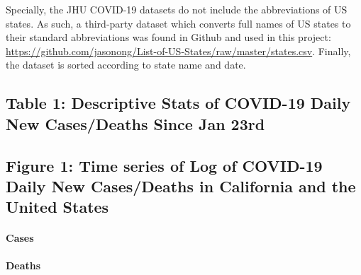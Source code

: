 \documentclass[
]{article}
\begin{document}
Specially, the JHU COVID-19 datasets do not include the abbreviations of
US states. As such, a third-party dataset which converts full names of
US states to their standard abbreviations was found in Github and used
in this project:
\url{https://github.com/jasonong/List-of-US-States/raw/master/states.csv}.
Finally, the dataset is sorted according to state name and date.

\hypertarget{table-1-descriptive-stats-of-covid-19-daily-new-casesdeaths-since-jan-23rd}{%
\subsection{Table 1: Descriptive Stats of COVID-19 Daily New
Cases/Deaths Since Jan
23rd}\label{table-1-descriptive-stats-of-covid-19-daily-new-casesdeaths-since-jan-23rd}}

\hypertarget{htmlwidget-d77711810ca43d831642}{}
\begin{datatables}

\end{datatables}

\hypertarget{figure-1-time-series-of-log-of-covid-19-daily-new-casesdeaths-in-california-and-the-united-states}{%
\subsection{Figure 1: Time series of Log of COVID-19 Daily New
Cases/Deaths in California and the United
States}\label{figure-1-time-series-of-log-of-covid-19-daily-new-casesdeaths-in-california-and-the-united-states}}

\hypertarget{cases}{%
\paragraph{Cases}\label{cases}}

\hypertarget{htmlwidget-e62dd78dc574b438acee}{}
\begin{plotly}

\end{plotly}

\hypertarget{deaths}{%
\paragraph{Deaths}\label{deaths}}

\hypertarget{htmlwidget-87bb61489e186ea2cd9f}{}
\begin{plotly}

\end{plotly}
\end{document}
